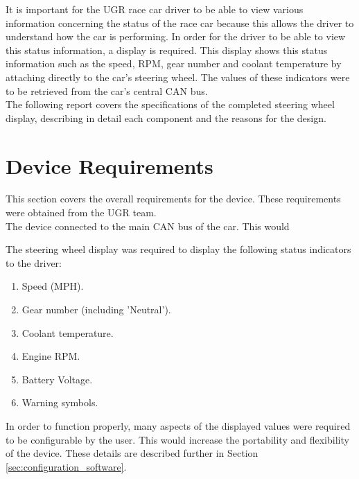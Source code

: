 \documentclass[a4paper,12pt]{article}
\begin{document}
It is important for the UGR race car driver to be able to view various information concerning the status of the race car because this allows the driver to understand how the car is performing. In order for the driver to be able to view this status information, a display is required. This display shows this status information such as the speed, RPM, gear number and coolant temperature by attaching directly to the car’s steering wheel. The values of these indicators were to be retrieved from the car's central CAN bus. \\

The following report covers the specifications of the completed steering wheel display, describing in detail each component and the reasons for the design. \\




\newpage
\section{Device Requirements}
\label{sec:device_requirements}

This section covers the overall requirements for the device. These requirements were obtained from the UGR team. \\

The device connected to the main CAN bus of the car. This would

The steering wheel display was required to display the following status indicators to the driver:

\begin{enumerate}
  \item Speed (MPH).
  \item Gear number (including 'Neutral').
  \item Coolant temperature.
  \item Engine RPM.
  \item Battery Voltage.
  \item Warning symbols.
\end{enumerate}

In order to function properly, many aspects of the displayed values were required to be configurable by the user. This would increase the portability and flexibility of the device. These details are described further in Section \ref{sec:configuration_software}. \\
\end{document}
